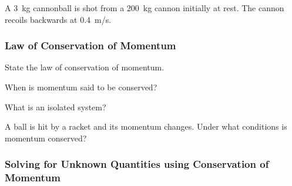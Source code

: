 \documentclass[]{exam}
\begin{document}
\begin{questions}
\question
A \SI{3}{kg} cannonball is shot from a \SI{200}{kg} cannon initially at rest. The cannon recoils backwards at \SI{0.4}{m/s}.

\begin{center}
\hspace{3cm}
\end{center}
\end{questions}

\subsubsection{Law of Conservation of Momentum}

\begin{questions}
\question
State the law of conservation of momentum.


\question
When is momentum said to be conserved?


\question
What is an isolated system?


\question
A ball is hit by a racket and its momentum changes. Under what conditions is momentum conserved?
\end{questions}

\subsubsection{Solving for Unknown Quantities using Conservation of Momentum}

\clearpage
\end{document}
